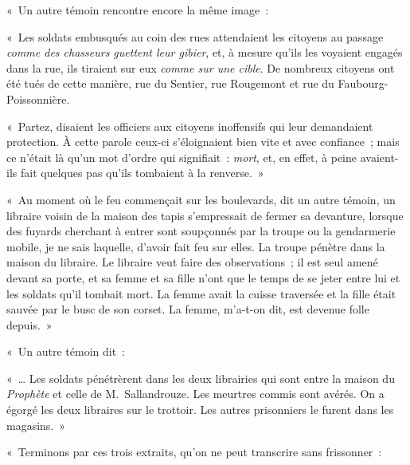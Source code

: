\documentclass[french,twoside]{book} %
\newcommand{\astertri}{\medskip\par\centerline{\color{rubric}\large\selectfont{\syms ✻\,✻\,✻}}\medskip\par}%
\newenvironment{quoteblock}%
  {\begin{quoting}}
  {\end{quoting}}
\newenvironment{quotebar}{%
    \def\FrameCommand{{\color{rubric!10!}\vrule width 0.5em} \hspace{0.9em}}%
    \def\OuterFrameSep{\itemsep} %
    \MakeFramed {\advance\hsize-\width \FrameRestore}
  }%
  {%
    \endMakeFramed
  }
\renewenvironment{quoteblock}%
  {%
    \savenotes
    \setstretch{0.9}
    \normalfont
    \begin{quotebar}
  }
  {%
    \end{quotebar}
    \spewnotes
  }
\begin{document}
\noindent « Un autre témoin rencontre encore la même image :\par

\begin{quoteblock}
 \noindent « Les soldats embusqués au coin des rues attendaient les citoyens au passage \emph{comme des chasseurs guettent leur gibier}, et, à mesure qu’ils les voyaient engagés dans la rue, ils tiraient sur eux \emph{comme sur une cible}. De nombreux citoyens ont été tués de cette manière, rue du Sentier, rue Rougemont et rue du Faubourg-Poissonnière.
 \end{quoteblock}


\astertri


\begin{quoteblock}
 \noindent « Partez, disaient les officiers aux citoyens inoffensifs qui leur demandaient protection. À cette parole ceux-ci s’éloignaient bien vite et avec confiance ; mais ce n’était là qu’un mot d’ordre qui signifiait : \emph{mort}, et, en effet, à peine avaient-ils fait quelques pas qu’ils tombaient à la renverse. »\par
 « Au moment où le feu commençait sur les boulevards, dit un autre témoin, un libraire voisin de la maison des tapis s’empressait de fermer sa devanture, lorsque des fuyards cherchant à entrer sont soupçonnés par la troupe ou la gendarmerie mobile, je ne sais laquelle, d’avoir fait feu sur elles. La troupe pénètre dans la maison du libraire. Le libraire veut faire des observations ; il est seul amené devant sa porte, et sa femme et sa fille n’ont que le temps de se jeter entre lui et les soldats qu’il tombait mort. La femme avait la cuisse traversée et la fille était sauvée par le busc de son corset. La femme, m’a-t-on dit, est devenue folle depuis. »
 \end{quoteblock}

\noindent « Un autre témoin dit :\par

\begin{quoteblock}
 \noindent « … Les soldats pénétrèrent dans les deux librairies qui sont entre la maison du \emph{Prophète} et celle de M. Sallandrouze. Les meurtres commis sont avérés. On a égorgé les deux libraires sur le trottoir. Les autres prisonniers le furent dans les magasins. »
 \end{quoteblock}

\noindent « Terminons par ces trois extraits, qu’on ne peut transcrire sans frissonner :\par
\end{document}
